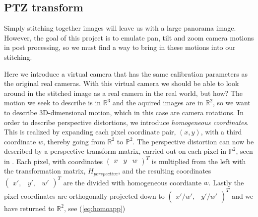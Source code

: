 \subsection{PTZ transform}
	Simply stitching together images will leave us with a large panorama image.
        However, the goal of this project is to emulate pan, tilt and zoom camera motions in post processing, so we must find a way to bring in these motions into our stitching.

	Here we introduce a virtual camera that has the same calibration parameters as the original real cameras.
	With this virtual camera we should be able to look around in the stitched image as a real camera in the real world, but how?
	The motion we seek to describe is in $\mathbb{R}^3$ and the aquired images are in $\mathbb{R}^2$, so we want to describe 3D-dimensional motion, which in this case are camera rotations.
	In order to describe perspective distortions, we introduce \emph{homogeneous coordinates}. 
	This is realized by expanding each pixel coordinate pair, $(x,y)$, with a third coordinate $w$, thereby going from $\mathbb{R}^2$ to $\mathbb{P}^2$.
	The perspective distortion can now be described by a perspective transform matrix, carried out on each pixel in $\mathbb{P}^2$, seen in \cite{hartley2003Multiple}.
	Each pixel, with coordinates $\left( \begin{smallmatrix} x & y & w \end{smallmatrix} \right)^T$
	is multiplied from the left with the transformation matrix, $H_{perspective}$, and the resulting coordinates $ \left( \begin{smallmatrix} x', & y', & w' \end{smallmatrix} \right) ^T$ are the divided with homogeneous coordiante $w$.
	Lastly the pixel coordinates are orthogonally projected down to $\left( \begin{smallmatrix} x'/w', & y'/w' \end{smallmatrix} \right)^T$ and we have returned to $\mathbb{R}^2$, see (\ref{eq:homoapp})

